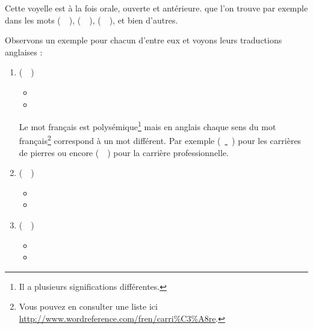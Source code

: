 Cette voyelle est à la fois orale, ouverte et antérieure. 
que l'on trouve par exemple dans les mots 
(~~),  (~~),  (~~), et bien d'autres.

Observons un exemple pour chacun d'entre eux et voyons leurs
traductions anglaises :\par

\begin{enumerate}
\item {} (~~)
  \begin{itemize}
  \item {}
    \item {}
    \end{itemize}
    Le mot français  est polysémique\footnote{Il a
      plusieurs significations différentes.} mais en anglais chaque
    sens du mot français\footnote{Vous pouvez en consulter une liste
      ici \url{http://www.wordreference.com/fren/carri\%C3\%A8re}.}  correspond à un mot différent. Par exemple
    (~\href{https://en.oxforddictionaries.com/definition/quarry}{
      }~) pour les carrières de pierres ou encore 
    (~\href{https://en.oxforddictionaries.com/definition/career}{}~)
    pour la carrière professionnelle.
\item {} (~~)
  \begin{itemize}
  \item {}
  \item {}
  \end{itemize}

  
\item {} (~~)
  \begin{itemize}
  \item {}
  \item {}
  \end{itemize}
   
\end{enumerate}

